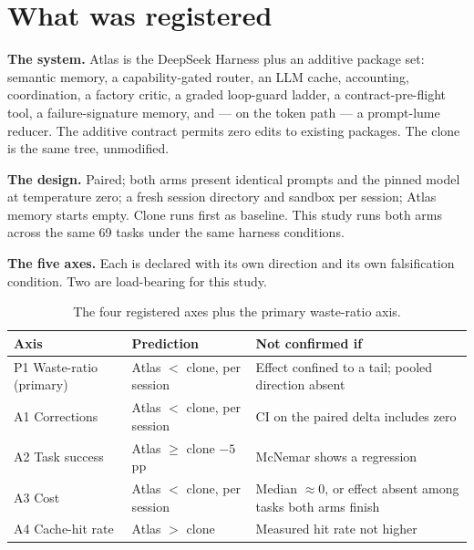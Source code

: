\documentclass[11pt]{article}
\begin{document}
\begin{abstract}
The primary axis --- waste-ratio --- is now observable on most of the suite instead of a handful of tail tasks. 39 of 69 paired tasks show a non-zero delta (versus three contract-cliff tasks in the earlier 64-task run), with mixed direction (22 Atlas-lower, 17 Atlas-higher). Pooled waste is 0.221 (clone) against 0.230 (Atlas); the per-session mean is 0.253 against 0.248. Neither pooled nor per-session sign is the headline --- the spread itself is the finding.

The decomposition is the contribution. The capability layer's value is no longer confined to a contract cliff: it cuts corrections, delivers a 34\% cost saving attributable to a single named region-placement mechanism, and costs exactly one completed task. Whether that is a good trade depends on how the guard-railing gains are priced against the mixed waste spread and the one lost completion.
\end{abstract}

\section{What was registered}
\label{sec:registered}

\textbf{The system.} Atlas is the DeepSeek Harness plus an additive package set: semantic memory, a capability-gated router, an LLM cache, accounting, coordination, a factory critic, a graded loop-guard ladder, a contract-pre-flight tool, a failure-signature memory, and --- on the token path --- a prompt-lume reducer. The additive contract permits zero edits to existing packages. The clone is the same tree, unmodified.

\textbf{The design.} Paired; both arms present identical prompts and the pinned model at temperature zero; a fresh session directory and sandbox per session; Atlas memory starts empty. Clone runs first as baseline. This study runs both arms across the same 69 tasks under the same harness conditions.

\textbf{The five axes.} Each is declared with its own direction and its own falsification condition. Two are load-bearing for this study.

\begin{table}[h]
\centering
\begin{tabular}{@{}llp{7.2cm}@{}}
\toprule
Axis & Prediction & Not confirmed if \\
\midrule
P1 Waste-ratio (primary) & Atlas $<$ clone, per session & Effect confined to a tail; pooled direction absent \\
A1 Corrections & Atlas $<$ clone, per session & CI on the paired delta includes zero \\
A2 Task success & Atlas $\geq$ clone $- 5$pp & McNemar shows a regression \\
A3 Cost & Atlas $<$ clone, per session & Median $\approx 0$, or effect absent among tasks both arms finish \\
A4 Cache-hit rate & Atlas $>$ clone & Measured hit rate not higher \\
\bottomrule
\end{tabular}
\caption{The four registered axes plus the primary waste-ratio axis.}
\label{tab:axes}
\end{table}
\end{document}
